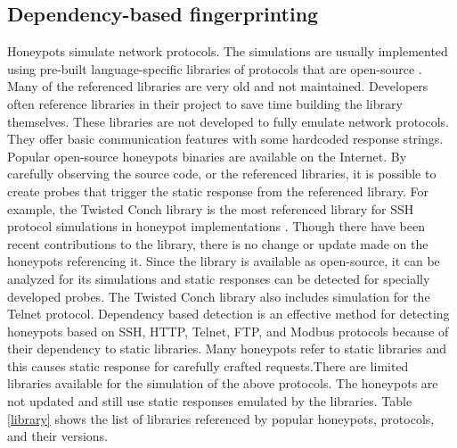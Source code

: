 
\subsection{Dependency-based fingerprinting}
Honeypots simulate network protocols. The simulations are usually implemented using pre-built language-specific libraries of protocols that are open-source \cite{Vetterl2018}. Many of the referenced libraries are very old and not maintained. Developers often reference libraries in their project to save time building the library themselves. These libraries are not developed to fully emulate network protocols. They offer basic communication features with some hardcoded response strings. Popular open-source honeypots binaries are available on the Internet. By carefully observing the source code, or the referenced libraries, it is possible to create probes that trigger the static response from the referenced library. For example, the Twisted Conch \cite{twisted}  library is the most referenced library for SSH protocol simulations in honeypot implementations \cite{counting}. Though there have been recent contributions to the library, there is no change or update made on the honeypots referencing it. Since the library is available as open-source, it can be analyzed for its simulations and static responses can be detected for specially developed probes. The Twisted Conch library also includes simulation for the Telnet protocol. Dependency based detection is an effective method for detecting honeypots based on SSH, HTTP, Telnet, FTP, and Modbus protocols because of their dependency to static libraries. Many honeypots refer to static libraries and this causes static response for carefully crafted requests.There are limited libraries available for the simulation of the above protocols. The honeypots are not updated and still use static responses emulated by the libraries. Table \ref{library} \cite{Vetterl2018} shows the list of libraries referenced by popular honeypots, protocols, and their versions. 




